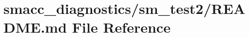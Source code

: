 \hypertarget{smacc__diagnostics_2sm__test2_2README_8md}{}\section{smacc\+\_\+diagnostics/sm\+\_\+test2/\+R\+E\+A\+D\+ME.md File Reference}
\label{smacc__diagnostics_2sm__test2_2README_8md}
